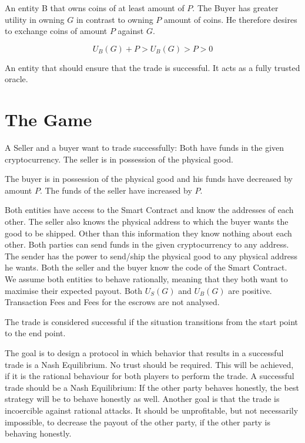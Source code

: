 \documentclass{cacthesis}
\begin{document}
An entity B that owns coins of at least amount of $P$. The Buyer has greater utility in owning $G$ in contrast to  owning $P$ amount of coins. He therefore desires to exchange coins of amount $P$ against $G$.

\begin{equation}
    U_B(G) + P > U_B(G) > P > 0
\end{equation}

 An entity that should ensure that the trade is successful. It acts as a fully trusted oracle.

\section{The Game}

A Seller and a buyer want to trade successfully: Both have funds in the given cryptocurrency. The seller is in possession of the physical good.

The buyer is in possession of the physical good and his funds have decreased by amount $P$. The funds of the seller have increased by $P$.

Both entities have access to the Smart Contract and know the addresses of each other. The seller also knows the physical address to which the buyer wants the good to be shipped. Other than this information they know nothing about each other.\newline 
Both parties can send funds in the given cryptocurrency to any address. The sender has the power to send/ship the physical good to any physical address he wants. Both the seller and the buyer know the code of the Smart Contract.\newline
We assume both entities to behave rationally, meaning that they both want to maximise their expected payout.\newline
Both $U_S(G)$ and $U_B(G)$ are positive. \newline
Transaction Fees and Fees for the escrows are not analysed.



The trade is considered successful if the situation transitions from the start point to the end point.

The goal is to design a protocol in which behavior that results in a successful trade is a Nash Equilibrium.\newline
No trust should be required. This will be achieved, if it is the rational behaviour for both players to perform the trade. A successful trade should be a Nash Equilibrium: If the other party behaves honestly, the best strategy will be to behave honestly as well.\newline
Another goal is that the trade is incoercible against rational attacks. It should be unprofitable, but not necessarily impossible, to decrease the payout of the other party, if the other party is behaving honestly. 
\end{document}
